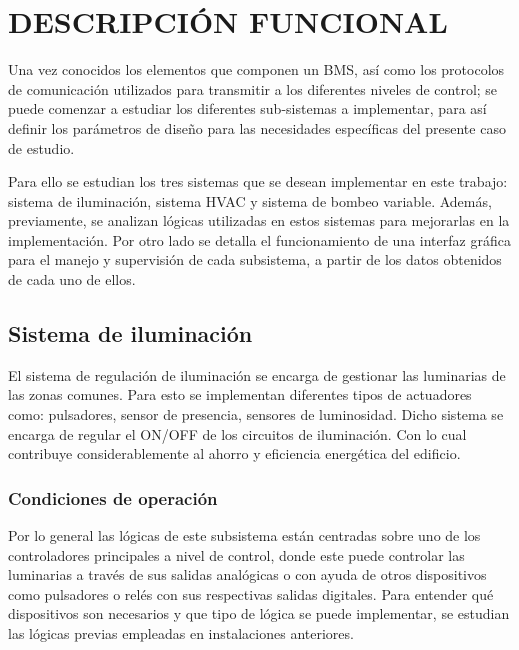 \chapter{DESCRIPCIÓN FUNCIONAL}
\thispagestyle{empty}
Una vez conocidos los elementos que componen un BMS, así como los protocolos de comunicación utilizados para transmitir a los diferentes niveles de control; se puede comenzar a estudiar los diferentes sub-sistemas a implementar, para así definir los parámetros de diseño para las necesidades específicas del presente caso de estudio.

Para ello se estudian los tres sistemas que se desean implementar en
este trabajo: sistema de iluminación, sistema HVAC y sistema de bombeo variable. Además, previamente, se analizan lógicas utilizadas en estos sistemas para mejorarlas en la implementación. Por otro lado se detalla el funcionamiento de una interfaz gráfica para el manejo y supervisión de cada subsistema, a partir de los datos obtenidos de cada uno de ellos.

\section{Sistema de iluminación}
El sistema de regulación de iluminación se encarga de gestionar las luminarias de las zonas comunes. Para esto se implementan diferentes tipos de actuadores como: pulsadores, sensor de presencia, sensores de luminosidad. Dicho sistema se encarga de regular el ON/OFF de los circuitos de iluminación. Con lo cual contribuye considerablemente al ahorro y eficiencia energética del edificio.

\subsection{Condiciones de operación}
Por lo general las lógicas de este subsistema están centradas sobre uno de los
controladores principales a nivel de control, donde este puede
controlar las luminarias a través de sus salidas analógicas o con
ayuda de otros dispositivos como pulsadores o relés con sus respectivas salidas digitales. Para entender qué dispositivos son necesarios y que tipo de lógica se puede implementar, se estudian las lógicas previas empleadas en instalaciones anteriores.
